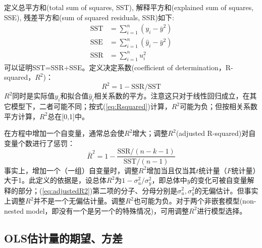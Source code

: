 \par 定义总平方和(total sum of squares, SST), 解释平方和(explained sum of squares, SSE), 残差平方和(sum of squared residuals, SSR)如下:
\begin{align}
    \text{SST}&=\sum_{i=1}^n (y_i-\bar{y}^2)\\
    \text{SSE}&=\sum_{i=1}^n (\hat{y}_i-\bar{y}^2)\\
    \text{SSR}&=\sum_{i=1}^n u_i^2
\end{align}
可以证明SST=SSR+SSE。定义决定系数(coefficient of determination，R-squared，$R^2$)：
\begin{equation}
    R^2=1-\text{SSR}/\text{SST}\label{eq:Rsquared}
\end{equation}
$R^2$同时是实际值$y_i$和拟合值$\hat{y}_i$相关系数的平方。注意这只对于线性回归成立，在其它模型下，二者可能不同；按式(\ref{eq:Rsquared})计算，$R^2$可能为负；但按相关系数平方计算，$R^2$总在[0,1]中。

\par 在方程中增加一个自变量，通常总会使$R^2$增大；调整$R^2$(adjusted R-squared)对自变量个数进行了惩罚：
\begin{equation}
    \bar{R}^2=1-\frac{\text{SSR}/(n-k-1)}{\text{SST}/(n-1)}\label{eq:adjustedR2}
\end{equation}
事实上，增加一个（一组）自变量时，调整$R^2$增加当且仅当其$t$统计量（$F$统计量）大于1。此定义的依据是，设总体$R^2$为$1-\sigma_u^2/\sigma_y^2$，即总体中$y$的变化可被自变量解释的部分；(\ref{eq:adjustedR2})第二项的分子、分母分别是$\sigma_u^2,\sigma_y^2$的无偏估计。但事实上调整$R^2$并不是一个无偏估计量。调整$R^2$也可能为负。对于两个非嵌套模型(non-nested model，即没有一个是另一个的特殊情况)，可用调整$R^2$进行模型选择。

\subsection{OLS估计量的期望、方差}

